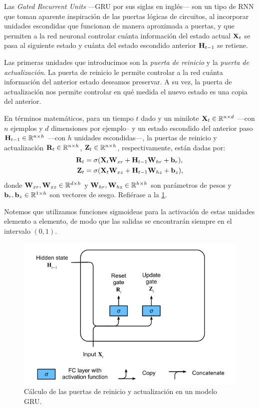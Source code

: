 \documentclass[12pt]{article}
\newcommand{\R}{\mathbb{R}}
\newcommand{\X}{\bm{\textbf X}}
\newcommand{\hi}{\bm{\textbf H}}
\newcommand{\we}{\bm{\textbf W}}
\newcommand{\bi}{\bm{\textbf b}}
\newcommand{\res}{\bm{\textbf R}}
\newcommand{\upd}{\bm{\textbf Z}}
\begin{document}
Las \textit{Gated Recurrent Units} ---GRU por sus siglas en inglés--- son un tipo de RNN que toman aparente inspiración de las puertas lógicas de circuitos, al incorporar unidades escondidas que funcionan de manera aproximada a puertas, y que permiten a la red neuronal controlar cuánta información del estado actual $ \X_t $ se pasa al siguiente estado y cuánta del estado escondido anterior $ \hi_{t-1} $ se retiene.

Las primeras unidades que introducimos son la \textit{puerta de reinicio} y la \textit{puerta de actualización}. La puerta de reinicio le permite controlar a la red cuánta información del anterior estado deseamos preservar. A su vez, la puerta de actualización nos permite controlar en qué medida el nuevo estado es una copia del anterior.

En términos matemáticos, para un tiempo $ t $ dado y un minilote $ \X_t \in \R^{n\times d} $ ---con $ n $ ejemplos y $ d $ dimensiones por ejemplo-- y un estado escondido del anterior paso $ \hi_{t-1} \in \R^{n \times h} $ ---con $ h $ unidades escondidas---, la puertas de reinicio y actualización $ \res_t \in \R^{n \times h} $, $ \upd_t \in \R^{n \times h} $, respectivamente, están dadas por:
\begin{align}
    \res_t &= \sigma(\X_t \we_{xr} + \hi_{t-1}\we_{hr} + \bi_r), \\
    \upd_t &= \sigma(\X_t \we_{xz} + \hi_{t-1}\we_{hz} + \bi_z),
\end{align}
donde $ \we_{xr}, \we_{xz} \in \R^{d \times h} $ y $ \we_{hr}, \we_{hz} \in \R^{h \times h} $ son parámetros de pesos y $ \bi_r, \bi_z \in \R^{1 \times h} $ son vectores de sesgo. Refiérase a la \cref{fig:gru-1}.

Notemos que utilizamos funciones sigmoideas para la activación de estas unidades elemento a elemento, de modo que las salidas se encontrarán siempre en el intervalo $ (0,1) $.

\begin{figure}
    \centering
    \includegraphics[width=0.7\linewidth]{images/gru-1}
    \caption{Cálculo de las puertas de reinicio y actualización en un modelo GRU.}
    \label{fig:gru-1}
\end{figure}
\end{document}
